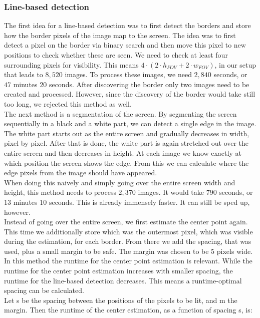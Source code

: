 \documentclass[journal,final,a4paper,twoside]{PS}
\begin{document}
\subsubsection{Line-based detection} 
\label{sec:linebased}
The first idea for a line-based detection was to first detect the borders and store how the border pixels of the image map to the screen. The idea was to first detect a pixel on the border via binary search and then move this pixel to new positions to check whether these are seen. We need to check at least four surrounding pixels for visibility. This means $4 \cdot (2 \cdot h_{FOV} + 2 \cdot w_{FOV})$, in our setup that leads to $8,520$ images. To process these images, we need $2,840$ seconds, or $47$ minutes $20$ seconds. After discovering the border only two images need to be created and processed. However, since the discovery of the border would take still too long, we rejected this method as well.\\
The next method is a segmentation of the screen. By segmenting the screen sequentially in a black and a white part, we can detect a single edge in the image. The white part starts out as the entire screen and gradually decreases in width, pixel by pixel. After that is done, the white part is again stretched out over the entire screen and then decreases in height. At each image we know exactly at which position the screen shows the edge. From this we can calculate where the edge pixels from the image should have appeared.\\
When doing this naively and simply going over the entire screen width and height, this method needs to process $2,370$ images. It would take $790$ seconds, or $13$ minutes $10$ seconds. This is already immensely faster. It can still be sped up, however.\\
Instead of going over the entire screen, we first estimate the center point again. This time we additionally store which was the outermost pixel, which was visible during the estimation, for each border. From there we add the spacing, that was used, plus a small margin to be safe. The margin was chosen to be $5$ pixels wide. In this method the runtime for the center point estimation is relevant. While the runtime for the center point estimation increases with smaller spacing, the runtime for the line-based detection decreases. This means a runtime-optimal spacing can be calculated.\\
Let s be the spacing between the positions of the pixels to be lit, and m the margin. Then the runtime of the center estimation, as a function of spacing s, is:
\end{document}

